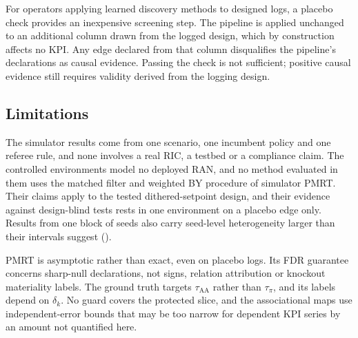 For operators applying learned discovery methods to designed logs, a placebo check provides an inexpensive screening
step. The pipeline is applied unchanged to an additional column drawn from the logged design, which by construction
affects no KPI. Any edge declared from that column disqualifies the pipeline's declarations as causal evidence. Passing
the check is not sufficient; positive causal evidence still requires validity derived from the logging design.

\subsection{Limitations}
\label{sec:disc_limits}

The simulator results come from one scenario, one incumbent policy and one referee rule, and none involves a real RIC,
a testbed or a compliance claim. The controlled environments model no deployed RAN, and no method evaluated in them
uses the matched filter and weighted BY procedure of simulator PMRT. Their claims apply to the tested
dithered-setpoint design, and their evidence against design-blind tests rests in one environment on a placebo edge
only. Results from one block of seeds also carry seed-level heterogeneity larger than their intervals suggest
().

PMRT is asymptotic rather than exact, even on placebo logs. Its FDR guarantee concerns sharp-null declarations, not
signs, relation attribution or knockout materiality labels. The ground truth
targets $\tau_{\mathrm{AA}}$ rather than $\tau_{\pi}$, and its labels depend on $\delta_k$. No guard
covers the protected slice, and the associational maps use independent-error bounds that may be too narrow for
dependent KPI series by an amount not quantified here.
